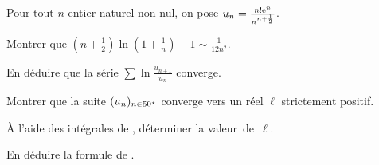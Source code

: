 \begin{exercice}
Pour tout $n$ entier naturel non nul, on pose $u_n = \frac{n! \mathrm{e}^n}{n^{n + \frac{1}{2}}}$.
\begin{questions}
\item Montrer que $\left(n + \frac{1}{2}\right) \ln\mathopen{}\left(1 + \frac{1}{n}\right) - 1\sim \frac{1}{12 n^2}$.

\item En déduire que la série $\sum \ln \frac{u_{n+1}}{u_n}$ converge.

\item Montrer que la suite $(u_n)_{n\in50^\star}$ converge vers un réel $\ell$ strictement positif.

\item À l'aide des intégrales de , déterminer la valeur~de~$\ell$.

\item En déduire la formule de .
\end{questions}
\end{exercice}

